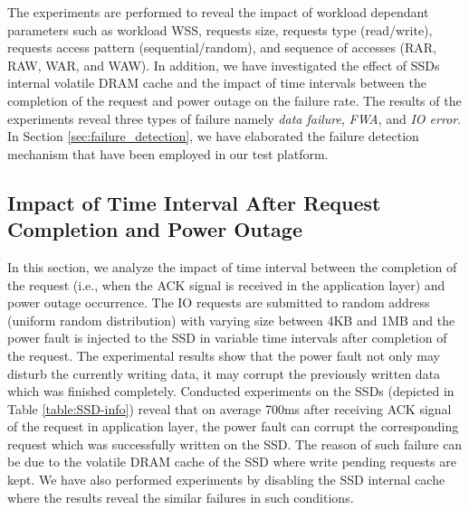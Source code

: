  The experiments are performed to reveal the impact of workload dependant  parameters such as workload WSS, requests size, requests type (read/write), requests access pattern (sequential/random), and sequence of accesses (RAR, RAW, WAR, and WAW). In addition, we have investigated the effect of SSDs internal volatile DRAM cache and the impact of time intervals between the completion of the request and power outage on the failure rate. The results of the experiments reveal three types of failure namely \emph{data failure}, \emph{FWA}, and \emph{IO error}. In Section \ref{sec:failure_detection}, we have elaborated the failure detection mechanism that have been employed in our test platform.
\vspace{-1em}
\subsection{Impact of Time Interval After Request Completion and Power Outage}
\vspace{-0.7em}
\label{sec:Time_Interval}

In this section, we analyze the impact of time interval between the completion of the request (i.e., when the ACK signal is received in the application layer) and power outage occurrence. The IO requests are submitted to random address (uniform random distribution) with varying size between 4KB and 1MB and the power fault is injected to the SSD in variable time intervals after completion of the request. The experimental results show that the power fault not only may disturb the currently writing data, it may corrupt the previously written data which was finished completely. Conducted experiments on the SSDs (depicted in Table \ref{table:SSD-info}) reveal that on average 700ms after receiving ACK signal of the request in application layer, the power fault can corrupt the corresponding request which was successfully written on the SSD. The reason of such failure can be due to the volatile DRAM cache of the SSD where write pending requests  are kept. We have also performed experiments by disabling the SSD internal cache where the results reveal the similar failures in such conditions.

